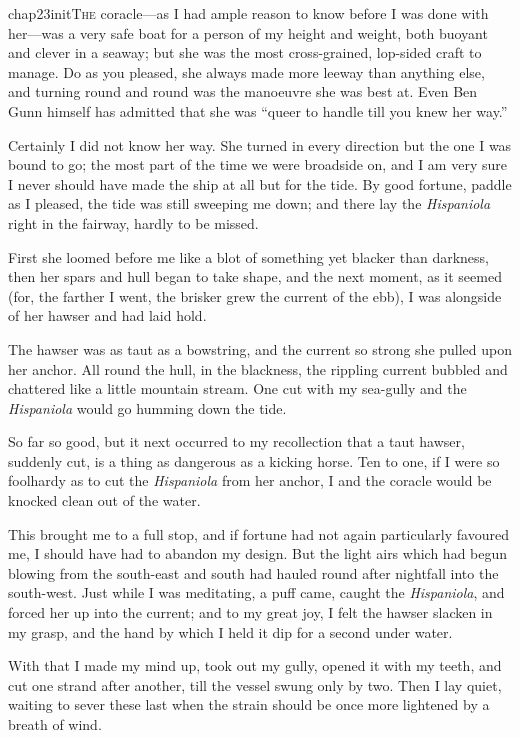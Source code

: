 
   \lettrine[lines=4,image=true]{chap23initT}{he} coracle---as I had ample reason to know before I was done with her---was a very safe boat for a person of my height and weight, both buoyant and clever in a seaway; but she was the most cross-grained, lop-sided craft to manage. Do as you pleased, she always made more leeway than anything else, and turning round and round was the manoeuvre she was best at. Even Ben Gunn himself has admitted that she was \enquote{queer to handle till you knew her way.}

Certainly I did not know her way. She turned in every direction but the one I was bound to go; the most part of the time we were broadside on, and I am very sure I never should have made the ship at all but for the tide. By good fortune, paddle as I pleased, the tide was still sweeping me down; and there lay the \textit{Hispaniola} right in the fairway, hardly to be missed.

First she loomed before me like a blot of something yet blacker than darkness, then her spars and hull began to take shape, and the next moment, as it seemed (for, the farther I went, the brisker grew the current of the ebb), I was alongside of her hawser and had laid hold.

The hawser was as taut as a bowstring, and the current so strong she pulled upon her anchor. All round the hull, in the blackness, the rippling current bubbled and chattered like a little mountain stream. One cut with my sea-gully and the \textit{Hispaniola} would go humming down the tide.

So far so good, but it next occurred to my recollection that a taut hawser, suddenly cut, is a thing as dangerous as a kicking horse. Ten to one, if I were so foolhardy as to cut the \textit{Hispaniola} from her anchor, I and the coracle would be knocked clean out of the water.

This brought me to a full stop, and if fortune had not again particularly favoured me, I should have had to abandon my design. But the light airs which had begun blowing from the south-east and south had hauled round after nightfall into the south-west. Just while I was meditating, a puff came, caught the \textit{Hispaniola}, and forced her up into the current; and to my great joy, I felt the hawser slacken in my grasp, and the hand by which I held it dip for a second under water.

With that I made my mind up, took out my gully, opened it with my teeth, and cut one strand after another, till the vessel swung only by two. Then I lay quiet, waiting to sever these last when the strain should be once more lightened by a breath of wind.

